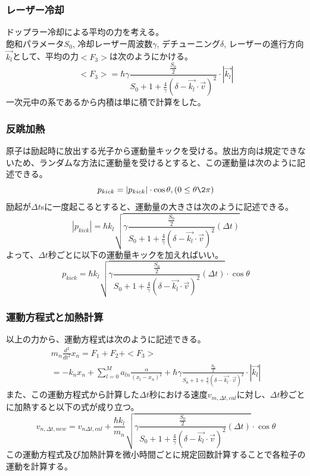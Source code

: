 \subsubsection{レーザー冷却}
     ドップラー冷却による平均の力を考える。\\
     飽和パラメータ$S_0$, 冷却レーザー周波数$\gamma$, デチューニング$\delta $, レーザーの進行方向$\vec{k_l}$として、平均の力$<F_3>$は次のようにかける。
    \begin{equation}
        <F_3> = \hbar\gamma\frac{\frac{S_0}{2}}{S_0+1+\frac{4}{\gamma}(\delta-\vec{k_l}\cdot\vec{v})^2}\cdot|\vec{k_l}|
    \end{equation}
    一次元中の系であるから内積は単に積で計算をした。
\subsubsection{反跳加熱}
     原子は励起時に放出する光子から運動量キックを受ける。放出方向は規定できないため、ランダムな方法に運動量を受けるとすると、この運動量は次のように記述できる。
    \begin{equation}
        p_{kick}=|p_{kick}|\cdot\cos\theta, (0\leq\theta\2\pi)
    \end{equation}
    励起が$\Delta t$sに一度起こるとすると、運動量の大きさは次のように記述できる。
    \begin{equation}
        |p_{kick}|=\hbar k_l\sqrt{\gamma\frac{\frac{S_0}{2}}{S_0+1+\frac{4}{\gamma}(\delta-\vec{k_l}\cdot\vec{v})^2}(\Delta t)}
    \end{equation}
    よって、$\Delta t$秒ごとに以下の運動量キックを加えればいい。
    \begin{equation}
        p_{kick}=\hbar k_l\sqrt{\gamma\frac{\frac{S_0}{2}}{S_0+1+\frac{4}{\gamma}(\delta-\vec{k_l}\cdot\vec{v})^2}(\Delta t)}\cdot\cos{\theta}
    \end{equation}
\subsubsection{運動方程式と加熱計算}
     以上の力から、運動方程式は次のように記述できる。
    \begin{multline}
        m_n\frac{d^2}{dt^2}x_n =F_1+F_2+<F_3> \\=-k_nx_n+\sum_{l=0}^M a_{ln} \frac{\alpha}{(x_l-x_n)^2}+\hbar\gamma\frac{\frac{S_0}{2}}{S_0+1+\frac{4}{\gamma}(\delta-\vec{k_l}\cdot\vec{v})^2}\cdot|\vec{k_l}|
    \end{multline}
    また、この運動方程式から計算した$\Delta t$秒における速度$v_{m,\Delta t,cal}$に対し、$\Delta t$秒ごとに加熱すると以下の式が成り立つ。
    \begin{equation}
        v_{n,\Delta t,new}=v_{n\Delta t,cal}+\frac{\hbar k_l}{m_n}\sqrt{\gamma\frac{\frac{S_0}{2}}{S_0+1+\frac{4}{\gamma}(\delta-\vec{k_l}\cdot\vec{v})^2}(\Delta t)}\cdot\cos{\theta}
    \end{equation}
    この運動方程式及び加熱計算を微小時間ごとに規定回数計算することで各粒子の運動を計算する。